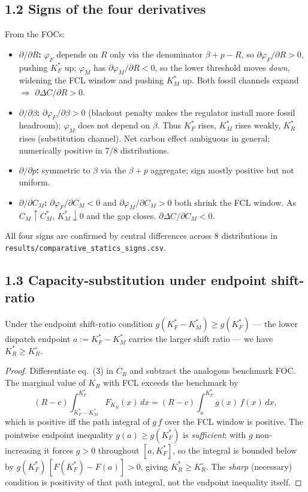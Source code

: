 \subsection*{1.2 Signs of the four derivatives}
From the FOCs:
\begin{itemize}
\item \textbf{$\partial/\partial R$:} $\varphi_F$ depends on $R$ only via the
denominator $\beta+p-R$, so $\partial\varphi_F/\partial R>0$, pushing $K_F^*$
up; $\varphi_M$ has $\partial\varphi_M/\partial R<0$, so the lower threshold
moves \emph{down}, widening the FCL window and pushing $K_M^*$ up. Both
fossil channels expand $\Rightarrow$
$\boxed{\partial\Delta C/\partial R>0}$.
\item \textbf{$\partial/\partial \beta$:} $\partial\varphi_F/\partial\beta>0$
(blackout penalty makes the regulator install more fossil headroom);
$\varphi_M$ does not depend on $\beta$. Thus $K_F^*$ rises, $K_M^*$ rises
weakly, $K_R^*$ rises (substitution channel). Net carbon effect ambiguous
in general; numerically positive in 7/8 distributions.
\item \textbf{$\partial/\partial p$:} symmetric to $\beta$ via the
$\beta+p$ aggregate; sign mostly positive but not uniform.
\item \textbf{$\partial/\partial C_M$:} $\partial\varphi_F/\partial C_M<0$
and $\partial\varphi_M/\partial C_M>0$ both shrink the FCL window. As
$C_M\uparrow C_M^{\!*}$\!\!, $K_M^*\downarrow 0$ and the gap closes.
$\boxed{\partial\Delta C/\partial C_M<0}$.
\end{itemize}
All four signs are confirmed by central differences across 8 distributions
in \texttt{results/comparative\_statics\_signs.csv}.

\subsection*{1.3 Capacity-substitution under endpoint shift-ratio}
\begin{proposition}\label{r3w2-prop:KR}
Under the endpoint shift-ratio condition
$g(K_F^*-K_M^*)\ge g(K_F^*)$ --- the lower dispatch endpoint
$a:=K_F^*-K_M^*$ carries the larger shift ratio --- we have
$K_R^*\ge K_R^\circ$.
\end{proposition}
\begin{proof}
Differentiate eq.\ (3) in $C_R$ and subtract the analogous benchmark FOC.
The marginal value of $K_R$ with FCL exceeds the benchmark by
\[
   (R-c)\!\int_{K_F^*-K_M^*}^{K_F^*}\!F_{K_R}(x)\,dx
   = (R-c)\!\int_{a}^{K_F^*}\!g(x)\,f(x)\,dx,
\]
which is positive iff the path integral of $g\,f$ over the FCL window is
positive. The pointwise endpoint inequality $g(a)\ge g(K_F^*)$ is
\emph{sufficient}: with $g$ non-increasing it forces $g>0$ throughout
$[a,K_F^*]$, so the integral is bounded below by $g(K_F^*)\,[F(K_F^*)-F(a)]>0$,
giving $K_R^*\ge K_R^\circ$. The \emph{sharp} (necessary) condition is
positivity of that path integral, not the endpoint inequality itself.
\end{proof}

